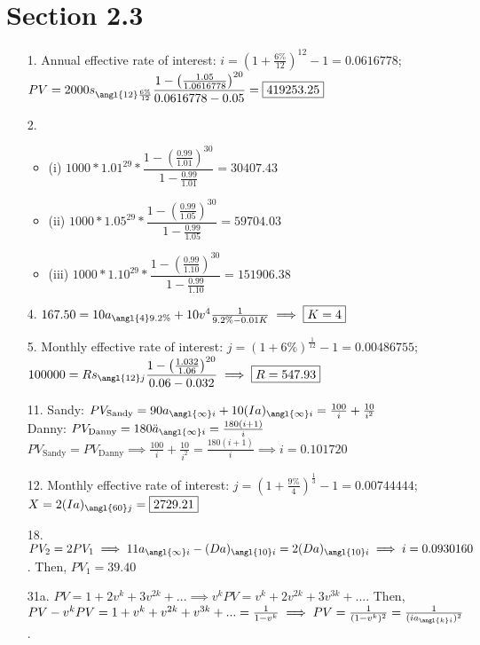 \documentclass{article}
\begin{document}
\section*{Section 2.3}
\begin{itemize}
	\item [1.] Annual effective rate of interest: $i=(1+\frac{6\%}{12})^{12}-1=0.0616778$; $PV=2000s_{\angl{12}\frac{6\%}{12}}\dfrac{1-\left(\frac{1.05}{1.0616778}\right)^{20}}{0.0616778-0.05}=\boxed{419253.25}$
	\item [2.]
	      \begin{itemize}
		      \item (i) $1000*1.01^{29}*\dfrac{1-(\frac{0.99}{1.01})^{30}}{1-\frac{0.99}{1.01}}=\boxed{30407.43}$
		      \item (ii) $1000*1.05^{29}*\dfrac{1-(\frac{0.99}{1.05})^{30}}{1-\frac{0.99}{1.05}}=\boxed{59704.03}$
		      \item (iii) $1000*1.10^{29}*\dfrac{1-(\frac{0.99}{1.10})^{30}}{1-\frac{0.99}{1.10}}=\boxed{151906.38}$
	      \end{itemize}
	\item [4.] $167.50=10a_{\angl{4}{9.2\%}}+10v^4\frac{1}{9.2\%-0.01K} \implies \boxed{K=4}$
	\item [5.] Monthly effective rate of interest: $j=(1+6\%)^\frac{1}{12}-1=0.00486755$; $100000=Rs_{\angl{12}j}\dfrac{1-\left(\frac{1.032}{1.06}\right)^{20}}{0.06-0.032} \implies \boxed{R=547.93}$
	\item [11.] Sandy: $PV_{\text{Sandy}}=90a_{\angl{\infty}i}+10(Ia)_{\angl{\infty}i}=\frac{100}{i}+\frac{10}{i^2}$\\Danny: $PV_{\text{Danny}}=180\ddot{a}_{\angl{\infty}i}=\frac{180(i+1)}{i}$\\$PV_{\text{Sandy}}=PV_{\text{Danny}} \implies \frac{100}{i}+\frac{10}{i^2}=\frac{180(i+1)}{i} \implies \boxed{i=0.101720}$
	\item [12.] Monthly effective rate of interest: $j=(1+\frac{9\%}{4})^{\frac{1}{3}}-1=0.00744444$; $X=2(Ia)_{\angl{60}j}=\boxed{2729.21}$
	\item [18.] $PV_2 = 2PV_1 \implies 11a_{\angl{\infty}i}-(Da)_{\angl{10}i}=2(Da)_{\angl{10}i} \implies i=0.0930160$. Then, $\boxed{PV_1=39.40}$
	\item [31a.] $PV=1+2v^k+3v^{2k}+... \implies v^kPV=v^k+2v^{2k}+3v^{3k}+...$. Then, $PV-v^kPV=1+v^k+v^{2k}+v^{3k}+...=\frac{1}{1-v^k} \implies PV=\frac{1}{(1-v^k)^2}=\frac{1}{(ia_{\angl{k}i})^2}$.
\end{itemize}
\end{document}
